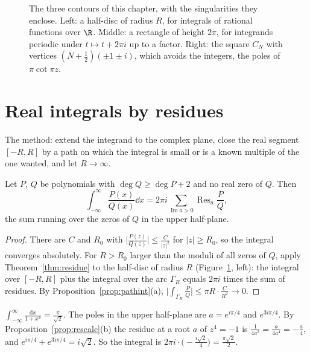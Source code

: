 \begin{figure}[ht]
\centering
{}
\caption{The three contours of this chapter, with the singularities they enclose. Left: a half-disc of radius $R$, for integrals of
rational functions over $\R$. Middle: a rectangle of height $2\pi$, for integrands periodic under $t\mapsto t+2\pi i$ up to a factor. Right:
the square $C_N$ with vertices $(N+\frac12)(\pm1\pm i)$, which avoids the integers, the poles of $\pi\cot\pi z$.}
\label{fig:contours}
\end{figure}

\section{Real integrals by residues}

The method: extend the integrand to the complex plane, close the real segment $[-R,R]$ by a path on which the integral is
small or is a known multiple of the one wanted, and let $R\to\infty$.

\begin{proposition}\label{prop:rationalint}
Let $P$, $Q$ be polynomials with $\deg Q\ge\deg P+2$ and no real zero of $Q$. Then
\[
\int_{-\infty}^\infty\frac{P(x)}{Q(x)}\dd x=2\pi i\sum_{\operatorname{Im}a>0}\operatorname{Res}_a\frac PQ,
\]
the sum running over the zeros of $Q$ in the upper half-plane.
\end{proposition}
\begin{proof}
There are $C$ and $R_0$ with $\bigl|\frac{P(z)}{Q(z)}\bigr|\le\frac C{|z|^2}$ for $|z|\ge R_0$, so the integral converges absolutely. For $R>R_0$ larger than the moduli of
all zeros of $Q$, apply Theorem~\ref{thm:residue} to the half-disc of radius $R$ (Figure~\ref{fig:contours}, left): the integral over $[-R,R]$ plus the
integral over the arc $\Gamma_R$ equals $2\pi i$ times the sum of residues. By Proposition~\ref{prop:pathint}(a), $\bigl|\int_{\Gamma_R}\frac PQ\bigr|\le\pi R\cdot\frac C{R^2}\to0$.
\end{proof}

\begin{example}
$\int_{-\infty}^\infty\frac{\mathrm dx}{1+x^4}=\frac\pi{\sqrt2}$. The poles in the upper half-plane are $a=e^{i\pi/4}$ and $e^{3i\pi/4}$. By Proposition~\ref{prop:rescalc}(b) the
residue at a root $a$ of $z^4=-1$ is $\frac1{4a^3}=\frac a{4a^4}=-\frac a4$, and $e^{i\pi/4}+e^{3i\pi/4}=i\sqrt2$. So the integral is $2\pi i\cdot\bigl(-\frac{i\sqrt2}4\bigr)=\frac{\pi\sqrt2}2$.
\end{example}

